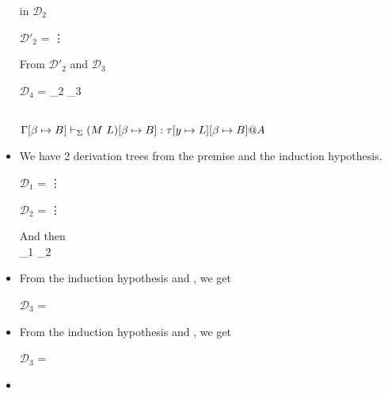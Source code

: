 \begin{itemize}
	       in $\mathcal{D}_2$
	      	      	      	      
	      $\mathcal{D'}_2$ = 
	      {\vdots}
	      	      	      	      
	      From $\mathcal{D'}_2$ and $\mathcal{D}_3$
	      	      	      	      
	      $\mathcal{D}_4$ = 
	      {_2 \andalso {}_3}
	      	      	      	      
	       \\
	      $\GGV (M\ L)\SB: \tau[y \mapsto L]\SB@A$
	      	      	      	      
	\item \TConv
	      	      	      	      
	      We have 2 derivation trees from the premise and the induction hypothesis.
	      	      	      	      
	      $\mathcal{D}_1$ = 
	      {\vdots}
	      	      	      	      
	      $\mathcal{D}_2$ = 
	      {\vdots}
	      	      	      	      
	      And then \\
	      {_1 \andalso {}_2}
	      	      	      	      
	\item \TTB
	      	      	      	      
	      From the induction hypothesis and \TTB, we get
	      	      	      	      
	      $\mathcal{D}_3$ = 
	      {}
	      	      	      	      
	\item \TTBL
	      	      	      	      
	      From the induction hypothesis and \TTBL, we get
	      	      	      	      
	      $\mathcal{D}_3$ = 
	      {
	      }
	      	      	      	      
	\item \TGen
	      	      	      	      

\end{itemize}
